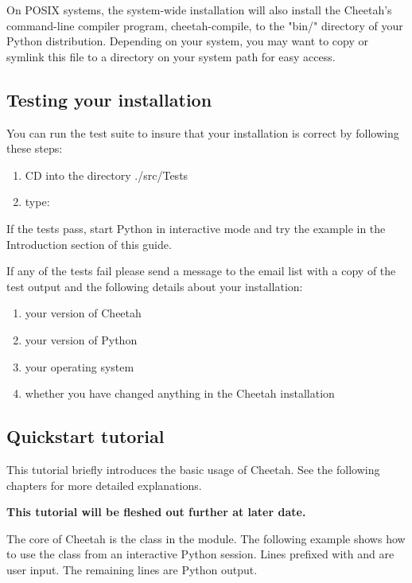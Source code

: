 On POSIX systems, the system-wide installation will also install the Cheetah's
command-line compiler program, cheetah-compile, to the "bin/" directory of your
Python distribution.  Depending on your system, you may want to copy or symlink
this file to a directory on your system path for easy access.

\subsection{Testing your installation}
\label{gettingStarted.test}

You can run the test suite to insure that your installation is correct by
following these steps:
\begin{enumerate}
\item CD into the directory ./src/Tests   
\item type:  
\end{enumerate}

If the tests pass, start Python in interactive mode and try the example in the
Introduction section of this guide.

If any of the tests fail please send a message to the email list with a copy of
the test output and the following details about your installation:

\begin{enumerate}
\item your version of Cheetah
\item your version of Python
\item your operating system
\item whether you have changed anything in the Cheetah installation
\end{enumerate}

\subsection{Quickstart tutorial}
\label{gettingStarted.tutorial}

This tutorial briefly introduces the basic usage of Cheetah.  See the
following chapters for more detailed explanations.  

{\bf This tutorial will be fleshed out further at later date.} 

The core of Cheetah is the  class in the 
module. The following example shows how to use the  class from an
interactive Python session. Lines prefixed with \code{>>>} and  are
user input.  The remaining lines are Python output.

